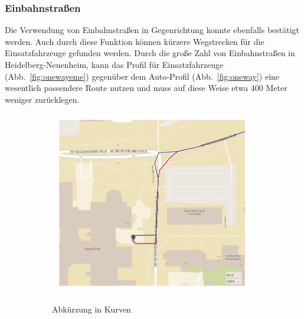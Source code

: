 \subsubsection{Einbahnstraßen}

Die Verwendung von Einbahnstraßen in Gegenrichtung konnte ebenfalls bestätigt werden.
Auch durch diese Funktion können kürzere Wegstrecken für die Einsatzfahrzeuge gefunden werden. 
Durch die große Zahl von Einbahnstraßen in Heidelberg-Neuenheim, kann das Profil für Einsatzfahrzeuge (Abb.~\ref{fig:onewayeme}) gegenüber dem Auto-Profil (Abb.~\ref{fig:oneway}) eine wesentlich passendere Route nutzen und muss auf diese Weise etwa 400 Meter weniger zurücklegen.

\begin{figure}[H]
\centering
\begin{subfigure}{0.49\textwidth}
\centering
\includegraphics[width = 0.95\textwidth]{../media/oppositecurve.png} \\
\caption{Abkürzung in Kurven}
\label{fig:oppositecurve}
\end{subfigure}
\begin{subfigure}{0.49\textwidth}
\centering

\end{subfigure}
\end{figure}
